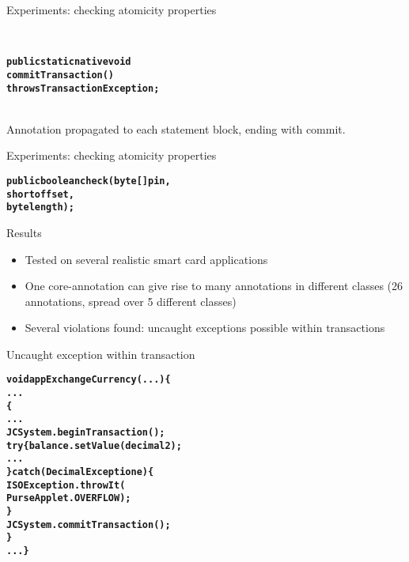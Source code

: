 \documentclass[final,nocolorBG,a4,marieke,nototal,pdf, accumulate,slideColor]{prosper}
\begin{document}
\begin{slide}{Experiments: checking atomicity properties}

\smallskip\\

\begin{alltt}
\textbf{
public static native void 
   commitTransaction() 
         throws TransactionException;}
\end{alltt}
\ \medskip\\
Annotation propagated to each statement block, ending with commit.
\end{slide}

\begin{slide}{Experiments: checking atomicity properties}
\smallskip\\

\begin{alltt}
\textbf{
public boolean check(byte[] pin, 
                     short offset, 
                     byte length);}
\end{alltt}
\end{slide}

\begin{slide}{Results}
\begin{itemize}
\item Tested on several realistic smart card applications
\item One core-annotation can give rise to many annotations in
different classes (26 annotations, spread over 5 different classes)
\item Several violations found: uncaught exceptions possible within
transactions 
\end{itemize}
\end{slide}

\begin{slide}{Uncaught exception within transaction}
\begin{alltt}
\textbf{void appExchangeCurrency(...) \{
   ...
    \{
      ...
      JCSystem.beginTransaction();	
      try \{balance.setValue(decimal2);
            ...
      \} catch (DecimalException e) \{
         ISOException.throwIt(
              PurseApplet.OVERFLOW);
      \}
      JCSystem.commitTransaction();
   \}
   ...\}}
\end{alltt}
\end{slide}
\end{document}
